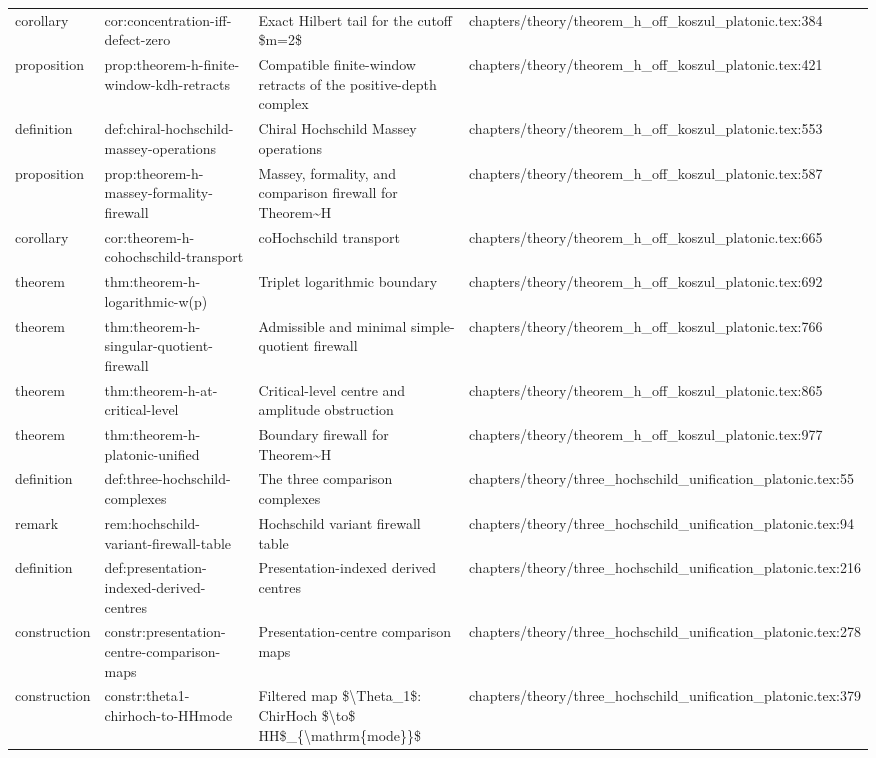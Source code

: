 \documentclass[11pt]{article}
\begin{document}
\begin{longtable}{L{0.10\textwidth}L{0.26\textwidth}L{0.42\textwidth}L{0.22\textwidth}}
corollary & cor:concentration-iff-defect-zero & Exact Hilbert tail for the cutoff \$m=2\$ & chapters/theory/theorem\_h\_off\_koszul\_platonic.tex:384\\
proposition & prop:theorem-h-finite-window-kdh-retracts & Compatible finite-window retracts of the positive-depth complex & chapters/theory/theorem\_h\_off\_koszul\_platonic.tex:421\\
definition & def:chiral-hochschild-massey-operations & Chiral Hochschild Massey operations & chapters/theory/theorem\_h\_off\_koszul\_platonic.tex:553\\
proposition & prop:theorem-h-massey-formality-firewall & Massey, formality, and comparison firewall for Theorem\textasciitilde{}H & chapters/theory/theorem\_h\_off\_koszul\_platonic.tex:587\\
corollary & cor:theorem-h-cohochschild-transport & coHochschild transport & chapters/theory/theorem\_h\_off\_koszul\_platonic.tex:665\\
theorem & thm:theorem-h-logarithmic-w(p) & Triplet logarithmic boundary & chapters/theory/theorem\_h\_off\_koszul\_platonic.tex:692\\
theorem & thm:theorem-h-singular-quotient-firewall & Admissible and minimal simple-quotient firewall & chapters/theory/theorem\_h\_off\_koszul\_platonic.tex:766\\
theorem & thm:theorem-h-at-critical-level & Critical-level centre and amplitude obstruction & chapters/theory/theorem\_h\_off\_koszul\_platonic.tex:865\\
theorem & thm:theorem-h-platonic-unified & Boundary firewall for Theorem\textasciitilde{}H & chapters/theory/theorem\_h\_off\_koszul\_platonic.tex:977\\
definition & def:three-hochschild-complexes & The three comparison complexes & chapters/theory/three\_hochschild\_unification\_platonic.tex:55\\
remark & rem:hochschild-variant-firewall-table & Hochschild variant firewall table & chapters/theory/three\_hochschild\_unification\_platonic.tex:94\\
definition & def:presentation-indexed-derived-centres & Presentation-indexed derived centres & chapters/theory/three\_hochschild\_unification\_platonic.tex:216\\
construction & constr:presentation-centre-comparison-maps & Presentation-centre comparison maps & chapters/theory/three\_hochschild\_unification\_platonic.tex:278\\
construction & constr:theta1-chirhoch-to-HHmode & Filtered map \$\textbackslash{}Theta\_1\$: ChirHoch \$\textbackslash{}to\$ HH\$\_\{\textbackslash{}mathrm\{mode\}\}\$ & chapters/theory/three\_hochschild\_unification\_platonic.tex:379\\

\end{longtable}
\end{document}
